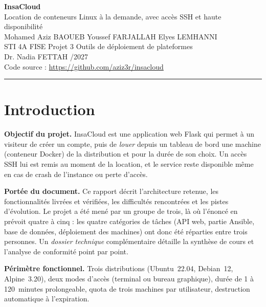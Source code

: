 \documentclass[11pt,a4paper]{article}
\begin{document}
\begin{center}
{\LARGE\bfseries InsaCloud}\\[2pt]
{\large Location de conteneurs Linux à la demande, avec accès SSH et haute disponibilité}\\[6pt]
{\small Mohamed Aziz BAOUEB \quad\textbullet\quad Youssef FARJALLAH \quad\textbullet\quad Elyes LEMHANNI\\[3pt]
STI 4A FISE \quad\textbullet\quad Projet 3 \quad\textbullet\quad Outils de déploiement de plateformes\\
Dr. Nadia FETTAH \quad\textbullet{}/2027}\\[2pt]
{\small\textcolor{gristexte}{Code source : \url{https://github.com/aziz3r/insacloud}}}
\end{center}
\vspace{-4pt}
\rule{\linewidth}{0.8pt}

\section{Introduction}

\textbf{Objectif du projet.} InsaCloud est une application web Flask qui permet à un visiteur de créer
un compte, puis de \emph{louer} depuis un tableau de bord une machine (conteneur Docker) de la
distribution et pour la durée de son choix. Un accès SSH lui est remis au moment de la location,
et le service reste disponible même en cas de crash de l'instance ou perte d'accès.

\textbf{Portée du document.} Ce rapport décrit l'architecture retenue, les fonctionnalités livrées et
vérifiées, les difficultés rencontrées et les pistes d'évolution. Le projet a été mené par un groupe
de trois, là où l'énoncé en prévoit quatre à cinq : les quatre catégories de tâches
(API web, partie Ansible, base de données, déploiement des machines) ont donc été réparties entre
trois personnes. Un \emph{dossier technique} complémentaire détaille la synthèse de cours et
l'analyse de conformité point par point.

\textbf{Périmètre fonctionnel.} Trois distributions (Ubuntu~22.04, Debian~12, Alpine~3.20), deux modes
d'accès (terminal ou bureau graphique), durée de 1 à 120~minutes prolongeable, quota de trois machines
par utilisateur, destruction automatique à l'expiration.

\end{document}
